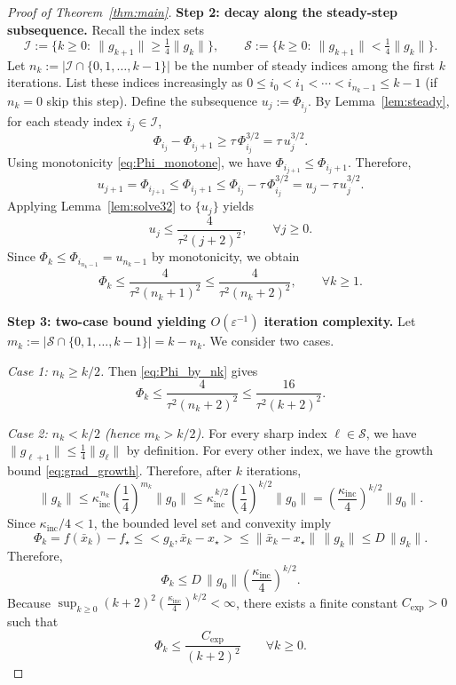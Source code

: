 \documentclass[10pt,twocolumn,letterpaper]{article}
\def\cO{O}%
\def\ip#1#2{<#1,#2>}%
\theoremstyle{compact}
\theoremstyle{compactremark}
\newcommand{\ip}[2]{\left\langle #1,#2\right\rangle}
\newcommand{\cO}{\mathcal{O}}
\begin{document}
\begin{proof}[Proof of Theorem~\ref{thm:main}]
\vspace{1pt}
\noindent\textbf{Step 2: decay along the steady-step subsequence.}
Recall the index sets
\[
\mathcal I:=\{k\ge 0:\ \|g_{k+1}\|\ge \tfrac14\|g_k\|\},
\qquad
\mathcal S:=\{k\ge 0:\ \|g_{k+1}\|< \tfrac14\|g_k\|\}.
\]
Let $n_k:=|\mathcal I\cap\{0,1,\dots,k-1\}|$ be the number of steady indices among the first $k$ iterations.
List these indices increasingly as $0\le i_0<i_1<\cdots<i_{n_k-1}\le k-1$ (if $n_k=0$ skip this step).
Define the subsequence $u_j:=\Phi_{i_j}$.
By Lemma~\ref{lem:steady}, for each steady index $i_j\in\mathcal I$,
\[
\Phi_{i_j}-\Phi_{i_j+1}\ge \tau\,\Phi_{i_j}^{3/2}=\tau\,u_j^{3/2}.
\]
Using monotonicity \eqref{eq:Phi_monotone}, we have $\Phi_{i_{j+1}}\le \Phi_{i_j+1}$.
Therefore,
\[
u_{j+1}=\Phi_{i_{j+1}}
\le \Phi_{i_j+1}
\le \Phi_{i_j}-\tau\,\Phi_{i_j}^{3/2}
= u_j-\tau\,u_j^{3/2}.
\]
Applying Lemma~\ref{lem:solve32} to $\{u_j\}$ yields
\begin{equation}\label{eq:u_bound}
u_j\le \frac{4}{\tau^2(j+2)^2},\qquad \forall j\ge 0.
\end{equation}
Since $\Phi_k\le \Phi_{i_{n_k-1}}=u_{n_k-1}$ by monotonicity, we obtain
\begin{equation}\label{eq:Phi_by_nk}
\Phi_k\le \frac{4}{\tau^2(n_k+1)^2}\le \frac{4}{\tau^2(n_k+2)^2},
\qquad \forall k\ge 1.
\end{equation}

\vspace{1pt}
\noindent\textbf{Step 3: two-case bound yielding $\cO(\varepsilon^{-1})$ iteration complexity.}
Let $m_k:=|\mathcal S\cap\{0,1,\dots,k-1\}|=k-n_k$.
We consider two cases.

\emph{Case 1: $n_k\ge k/2$.}
Then \eqref{eq:Phi_by_nk} gives
\[
\Phi_k\le \frac{4}{\tau^2(n_k+2)^2}\le \frac{16}{\tau^2(k+2)^2}.
\]

\emph{Case 2: $n_k< k/2$ (hence $m_k>k/2$).}
For every sharp index $\ell\in\mathcal S$, we have $\|g_{\ell+1}\|\le \frac14\|g_\ell\|$ by definition.
For every other index, we have the growth bound \eqref{eq:grad_growth}.
Therefore, after $k$ iterations,
\[
\|g_k\|
\le \kappa_{\mathrm{inc}}^{\,n_k}\left(\frac14\right)^{m_k}\|g_0\|
\le \kappa_{\mathrm{inc}}^{\,k/2}\left(\frac14\right)^{k/2}\|g_0\|
=\left(\frac{\kappa_{\mathrm{inc}}}{4}\right)^{k/2}\|g_0\|.
\]
Since $\kappa_{\mathrm{inc}}/4<1$, the bounded level set and convexity imply
\[
\Phi_k=f(\bar x_k)-f_\star
\le \ip{g_k}{\bar x_k-x_\star}
\le \|\bar x_k-x_\star\|\,\|g_k\|
\le D\,\|g_k\|.
\]
Therefore,
\[
\Phi_k\le D\,\|g_0\|\left(\frac{\kappa_{\mathrm{inc}}}{4}\right)^{k/2}.
\]
Because $\sup_{k\ge 0}(k+2)^2\left(\frac{\kappa_{\mathrm{inc}}}{4}\right)^{k/2}<\infty$, there exists a finite constant $C_{\exp}>0$ such that
\[
\Phi_k\le \frac{C_{\exp}}{(k+2)^2}\qquad\forall k\ge 0.
\]


\end{proof}
\end{document}
